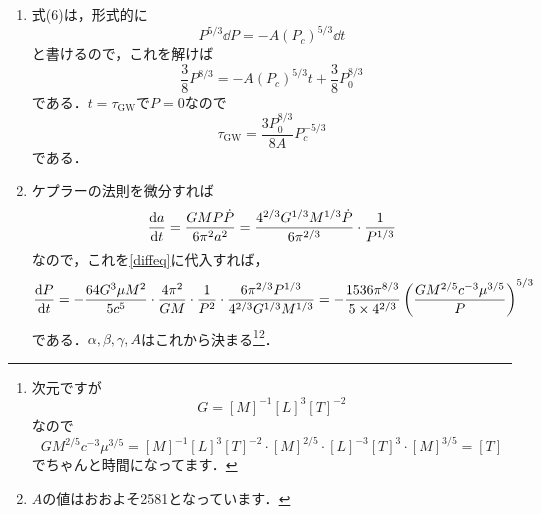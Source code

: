 \documentclass[a4paper,pdflatex,ja=standard]{bxjsarticle}
\begin{document}
\begin{enumerate}
  \item 
  式(6)は，形式的に
  \begin{equation}
    P^{5/3} \dd P
    =
    -A(P_{c})^{5/3}\dd t
  \end{equation}
  と書けるので，これを解けば
  \begin{equation}
    \frac{3}{8}P^{8/3}
    =
    -A(P_{c})^{5/3}t + \frac{3}{8}P_{0}^{8/3}
  \end{equation}
  である．$t=\tau_{\text{GW}}$で$P=0$なので
  \begin{equation}
    \tau_{\text{GW}}
    =
    \frac{3P_{0}^{8/3}}{8A}P_{c}^{-5/3}
    \label{tau}
  \end{equation}
  である．

  \item 
  ケプラーの法則を微分すれば
  \begin{equation}
    \dv{a}{t}
    =
    \frac{GMP\dot{P}}{6\pi^2a^2}
    =
    \frac{4^{2/3}G^{1/3}M^{1/3}\dot{P}}{6\pi^{2/3}}\cdot\frac{1}{P^{1/3}}
  \end{equation}
  なので，これを\eqref{diffeq}に代入すれば，
  \begin{equation}
    \dv{P}{t}
    =
    -\frac{64 G^3 \mu M^2}{5c^5}\cdot
    \frac{4\pi^2}{GM}\cdot\frac{1}{P^2}
    \cdot\frac{6\pi^{2/3}P^{1/3}}{4^{2/3}G^{1/3}M^{1/3}}
    =
    -\frac{1536\pi^{8/3}}{5\times 4^{2/3}}\left(  
      \frac{GM^{2/5}c^{-3}\mu^{3/5}}{P}
    \right)^{5/3}
  \end{equation}
  である．$\alpha,\beta,\gamma,A$はこれから決まる\footnote{次元ですが
  \begin{equation}
    G=[M]^{-1}[L]^{3}[T]^{-2}
  \end{equation}
  なので
  \begin{equation}
    GM^{2/5}c^{-3}\mu^{3/5}
    =
    [M]^{-1}[L]^{3}[T]^{-2}
    \cdot
    [M]^{2/5}
    \cdot
    [L]^{-3}[T]^{3}
    \cdot
    [M]^{3/5}
    =
    [T]
  \end{equation}
  でちゃんと時間になってます．
  }\footnote{$A$の値はおおよそ2581となっています．}．


\end{enumerate}
\end{document}
